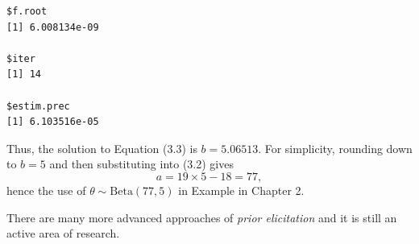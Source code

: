 {\begin{verbatim}
$f.root
[1] 6.008134e-09

$iter
[1] 14

$estim.prec
[1] 6.103516e-05
\end{verbatim}















Thus, the solution to Equation (3.3) is $b=5.06513$.  For simplicity, rounding down to $b=5$ and then substituting into (3.2) gives
$$
a = 19 \times 5 -18 = 77,
$$
hence the use of $\theta \sim \mathrm{Beta}(77,5)$ in Example  in Chapter 2.}

There are many more advanced approaches of \emph{prior elicitation} and it is still an active area of research.

\clearpage



















































































